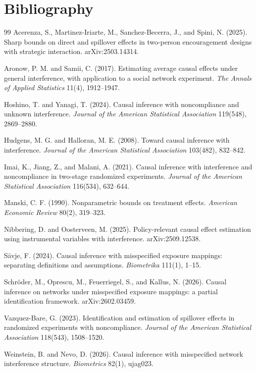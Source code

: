 \documentclass[11pt]{article}
\theoremstyle{definition}
\theoremstyle{plain}
\theoremstyle{remark}
\begin{document}
\section{Bibliography}
\begin{thebibliography}{99}
Acerenza, S., Martinez-Iriarte, M., Sanchez-Becerra, J., and Spini, N. (2025).
Sharp bounds on direct and spillover effects in two-person encouragement
designs with strategic interaction.
arXiv:2503.14314.

Aronow, P. M. and Samii, C. (2017).
Estimating average causal effects under general interference, with application
to a social network experiment.
\emph{The Annals of Applied Statistics} 11(4), 1912--1947.

Hoshino, T. and Yanagi, T. (2024).
Causal inference with noncompliance and unknown interference.
\emph{Journal of the American Statistical Association} 119(548), 2869--2880.

Hudgens, M. G. and Halloran, M. E. (2008).
Toward causal inference with interference.
\emph{Journal of the American Statistical Association} 103(482), 832--842.

Imai, K., Jiang, Z., and Malani, A. (2021).
Causal inference with interference and noncompliance in two-stage randomized
experiments.
\emph{Journal of the American Statistical Association} 116(534), 632--644.

Manski, C. F. (1990).
Nonparametric bounds on treatment effects.
\emph{American Economic Review} 80(2), 319--323.

Nibbering, D. and Oosterveen, M. (2025).
Policy-relevant causal effect estimation using instrumental variables with
interference.
arXiv:2509.12538.

S\"avje, F. (2024).
Causal inference with misspecified exposure mappings: separating definitions and
assumptions.
\emph{Biometrika} 111(1), 1--15.

Schr\"oder, M., Oprescu, M., Feuerriegel, S., and Kallus, N. (2026).
Causal inference on networks under misspecified exposure mappings: a partial
identification framework.
arXiv:2602.03459.

Vazquez-Bare, G. (2023).
Identification and estimation of spillover effects in randomized experiments
with noncompliance.
\emph{Journal of the American Statistical Association} 118(543), 1508--1520.

Weinstein, B. and Nevo, D. (2026).
Causal inference with misspecified network interference structure.
\emph{Biometrics} 82(1), ujag023.
\end{thebibliography}
\end{document}
